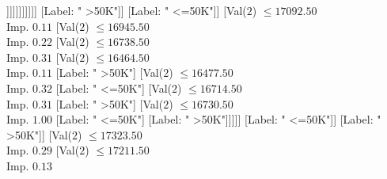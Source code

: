 \documentclass[margin=10pt]{standalone}
\begin{document}
\begin{forest}
																							[Label: " >50K"]
																							[Val($2$) $ \leq 15078.50$ \\ Imp. $0.06$
																								[Label: " <=50K"]
																								[Val($2$) $ \leq 15082.50$ \\ Imp. $0.14$
																									[Label: " >50K"]
																									[Val($2$) $ \leq 15212.50$ \\ Imp. $0.12$
																										[Label: " <=50K"]
																										[Val($2$) $ \leq 15246.50$ \\ Imp. $0.20$
																											[Label: " >50K"]
																											[Val($2$) $ \leq 15308.50$ \\ Imp. $0.12$
																												[Label: " <=50K"]
																												[Val($2$) $ \leq 15347.50$ \\ Imp. $0.32$
																													[Label: " >50K"]
																													[Val($2$) $ \leq 15456.50$ \\ Imp. $0.17$
																														[Label: " <=50K"]
																														[Val($2$) $ \leq 15485.50$ \\ Imp. $0.92$
																															[Label: " >50K"]
																															[Label: " <=50K"]]]]]]]]]]]
																					[Label: " >50K"]]
																				[Label: " <=50K"]]
																			[Val($2$) $ \leq 17092.50$ \\ Imp. $0.11$
																				[Val($2$) $ \leq 16945.50$ \\ Imp. $0.22$
																					[Val($2$) $ \leq 16738.50$ \\ Imp. $0.31$
																						[Val($2$) $ \leq 16464.50$ \\ Imp. $0.11$
																							[Label: " >50K"]
																							[Val($2$) $ \leq 16477.50$ \\ Imp. $0.32$
																								[Label: " <=50K"]
																								[Val($2$) $ \leq 16714.50$ \\ Imp. $0.31$
																									[Label: " >50K"]
																									[Val($2$) $ \leq 16730.50$ \\ Imp. $1.00$
																										[Label: " <=50K"]
																										[Label: " >50K"]]]]]
																						[Label: " <=50K"]]
																					[Label: " >50K"]]
																				[Val($2$) $ \leq 17323.50$ \\ Imp. $0.29$
																					[Val($2$) $ \leq 17211.50$ \\ Imp. $0.13$

\end{forest}
\end{document}
